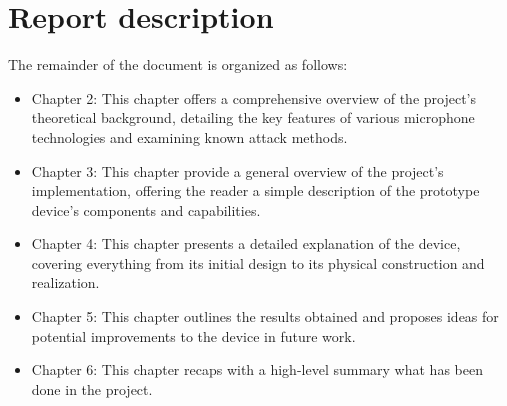 \section{Report description}
The remainder of the document is organized as follows:
\begin{itemize}
    \item Chapter 2: This chapter offers a comprehensive overview of the project's theoretical background, detailing the key features of various microphone technologies and examining known attack methods.
    \item Chapter 3: This chapter provide a general overview of the project's implementation, offering the reader a simple description of the prototype device's components and capabilities.
    \item Chapter 4: This chapter presents a detailed explanation of the device, covering everything from its initial design to its physical construction and realization.
    \item Chapter 5: This chapter outlines the results obtained and proposes ideas for potential improvements to the device in future work.
    \item Chapter 6: This chapter recaps with a high-level summary what has been done in the project.
\end{itemize}

